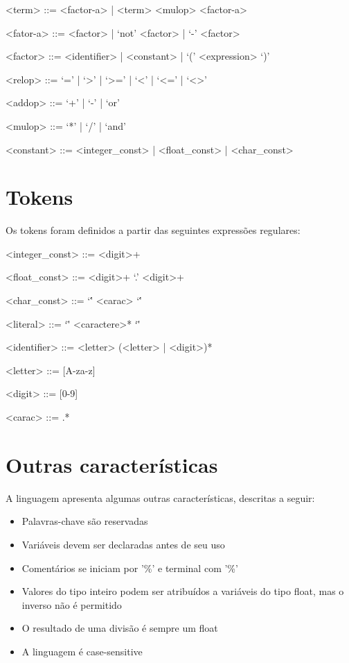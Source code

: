 \begin{grammar}
<term> ::= <factor-a> | <term> <mulop> <factor-a>

<fator-a> ::= <factor> | `not' <factor> | `-' <factor>

<factor> ::= <identifier> | <constant> | `(' <expression> `)'

<relop> ::= `=' | `>' | `>=' | `<' | `<=' | `<>'

<addop> ::= `+' | `-' | `or'

<mulop> ::= `*' | `/' | `and'

<constant> ::= <integer_const> | <float_const> | <char_const>

\end{grammar}

\section{Tokens}
\label{sec:tokens}

Os tokens foram definidos a partir das seguintes expressões regulares:

\begin{grammar}

<integer_const> ::= <digit>+

<float_const> ::= <digit>+ `.' <digit>+

<char_const> ::= `\'' <carac> `\''

<literal> ::= `\"' <caractere>* `\"'

<identifier> ::= <letter> (<letter> | <digit>)*

<letter> ::= [A-za-z]

<digit> ::= [0-9]

<carac> ::= .*

\end{grammar}

\section{Outras características}
\label{sec:caracteristicas}

A linguagem apresenta algumas outras características, descritas a seguir:

\begin{itemize}
\item Palavras-chave são reservadas
\item Variáveis devem ser declaradas antes de seu uso
\item Comentários se iniciam por '\%' e terminal com '\%'
\item Valores do tipo inteiro podem ser atribuídos a variáveis do tipo float, mas o inverso não é permitido
\item O resultado de uma divisão é sempre um float
\item A linguagem é case-sensitive
\end{itemize}